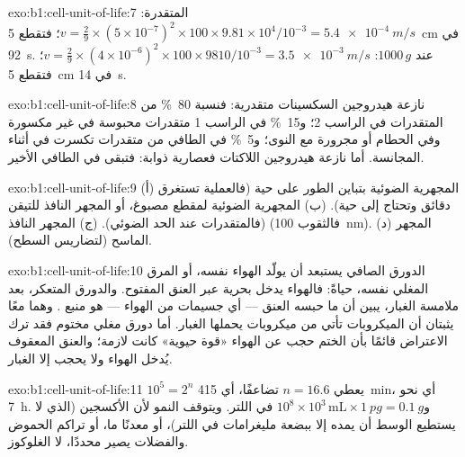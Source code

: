 \begin{solution}{exo:b1:cell-unit-of-life:7}
المتقدرة: $v = \frac{2}{9}\times(5\times 10^{-7})^2\times 100\times
9.81\times 10^4/10^{-3} = \qty{5.4e-4}{m/s}$؛ فتقطع \qty{5}{cm} في
\qty{92}{s}.  عند $1000\,g$: $v = \frac{2}{9}\times(4\times
10^{-6})^2\times 100\times 9810/10^{-3} = \qty{3.5e-3}{m/s}$؛ فتقطع
\qty{5}{cm} في \qty{14}{s}.
\end{solution}

\begin{solution}{exo:b1:cell-unit-of-life:8}
نازعة هيدروجين السكسينات متقدرية: فنسبة \qty{80}{\%} من المتقدرات في
الراسب 2؛ و\qty{15}{\%} في الراسب 1 متقدرات محبوسة في  غير
مكسورة وفي الحطام أو مجرورة مع النوى؛ و\qty{5}{\%} في الطافي من
متقدرات تكسرت في أثناء المجانسة. أما نازعة هيدروجين اللاكتات فعصارية
ذوابة: فتبقى في الطافي الأخير.
\end{solution}

\begin{solution}{exo:b1:cell-unit-of-life:9}
(أ) المجهرية الضوئية بتباين الطور على  حية (فالعملية تستغرق
دقائق وتحتاج إلى  حية). (ب) المجهرية الضوئية لمقطع مصبوغ، أو
المجهر النافذ للتيقن (فالمتقدرات عند الحد الضوئي). (ج) المجهر النافذ
(فالثقوب \qty{100}{nm}). (د) المجهر الماسح (لتضاريس السطح).
\end{solution}

\begin{solution}{exo:b1:cell-unit-of-life:10}
الدورق الصافي يستبعد أن يولّد الهواء نفسه، أو المرق المغلي نفسه،
حياةً: فالهواء يدخل بحرية عبر العنق المفتوح. والدورق المتعكر، بعد
ملامسة الغبار، يبين أن ما حبسه العنق --- أي جسيمات من الهواء --- هو
منبع . وهما معًا يثبتان أن الميكروبات تأتي من ميكروبات يحملها
الغبار. أما دورق مغلي مختوم فقد ترك الاعتراض قائمًا بأن الختم حجب عن
الهواء «قوة حيوية» كانت لازمة؛ والعنق المعقوف يُدخل الهواء ولا يحجب
إلا الغبار.
\end{solution}

\begin{solution}{exo:b1:cell-unit-of-life:11}
$10^5 = 2^{n}$ يعطي $n = 16.6$ تضاعفًا، أي \qty{415}{min}، أي نحو
\qty{7}{h}. و$10^8\times 10^3\,\mathrm{mL}\times\qty{1}{pg} = \qty{0.1}{g}$
في اللتر. ويتوقف النمو لأن الأكسجين (الذي لا يستطيع الوسط أن يمده
إلا ببضعة مليغرامات في اللتر)، أو معدنًا ما، أو تراكم الحموض
والفضلات يصير محددًا، لا الغلوكوز.
\end{solution}

